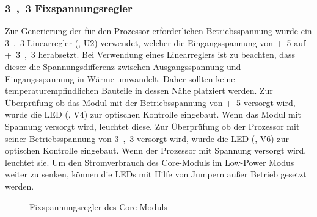 \subsubsection{\unit{3,3}{\volt} Fixspannungsregler}
Zur Generierung der für den Prozessor erforderlichen Betriebsspannung wurde ein \unit{3,3}{\volt}-Linearregler (, U2) verwendet, welcher die Eingangsspannung von \unit{+5}{\volt} auf \unit{+3,3}{\volt} herabsetzt. Bei Verwendung eines Linearreglers ist zu beachten, dass dieser die Spannungsdifferenz zwischen Ausgangsspannung und Eingangsspannung in Wärme umwandelt. Daher sollten keine temperaturempfindlichen Bauteile in dessen Nähe platziert werden. Zur Überprüfung ob das Modul mit der Betriebsspannung von \unit{+5}{\volt} versorgt wird, wurde die LED (, V4) zur optischen Kontrolle eingebaut. Wenn das Modul mit Spannung versorgt wird, leuchtet diese. Zur Überprüfung ob der Prozessor mit seiner Betriebsspannung von \unit{3,3}{\volt} versorgt wird, wurde die LED (, V6) zur optischen Kontrolle eingebaut. Wenn der Prozessor mit Spannung versorgt wird, leuchtet sie. Um den Stromverbrauch des \gls{Core-Modul}s im Low-Power Modus weiter zu senken, können die LEDs mit Hilfe von Jumpern außer Betrieb gesetzt werden.

\begin{figure}[htb]
    \centering
    \qquad
    \qquad
    \caption[Fixspannungsregler des Core-Moduls]{Fixspannungsregler des \gls{Core-Modul}s}
    \label{fig:coremodul-fix}
\end{figure}


